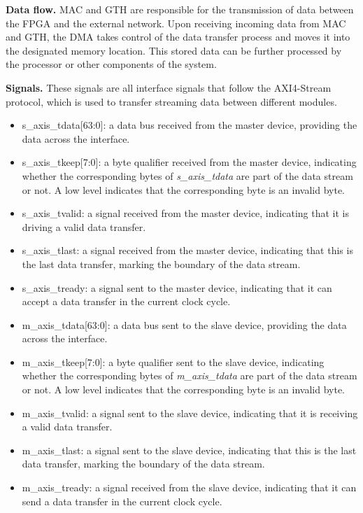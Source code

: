     \textbf{Data flow.} MAC and GTH are responsible for the transmission of data between the FPGA and the external network. Upon receiving incoming data from MAC and GTH, the DMA takes control of the data transfer process and moves it into the designated memory location. This stored data can be further processed by the processor or other components of the system.

    \textbf{Signals.} These signals are all interface signals that follow the AXI4-Stream protocol, which is used to transfer streaming data between different modules.

    \begin{itemize}
    \item {s\_axis\_tdata[63:0]}: a data bus received from the master device, providing the data across the interface.
    \item {s\_axis\_tkeep[7:0]}: a byte qualifier received from the master device, indicating whether the corresponding bytes of \emph{s\_axis\_tdata} are part of the data stream or not. A low level indicates that the corresponding byte is an invalid byte.
    \item {s\_axis\_tvalid}: a signal received from the master device, indicating that it is driving a valid data transfer.
    \item {s\_axis\_tlast}: a signal received from the master device, indicating that this is the last data transfer, marking the boundary of the data stream.
    \item {s\_axis\_tready}: a signal sent to the master device, indicating that it can accept a data transfer in the current clock cycle.
    \item {m\_axis\_tdata[63:0]}: a data bus sent to the slave device, providing the data across the interface.
    \item {m\_axis\_tkeep[7:0]}: a byte qualifier sent to the slave device, indicating whether the corresponding bytes of \emph{m\_axis\_tdata} are part of the data stream or not. A low level indicates that the corresponding byte is an invalid byte.
    \item {m\_axis\_tvalid}: a signal sent to the slave device, indicating that it is receiving a valid data transfer.
    \item {m\_axis\_tlast}: a signal sent to the slave device, indicating that this is the last data transfer, marking the boundary of the data stream.
    \item {m\_axis\_tready}: a signal received from the slave device, indicating that it can send a data transfer in the current clock cycle.
    \end{itemize}

